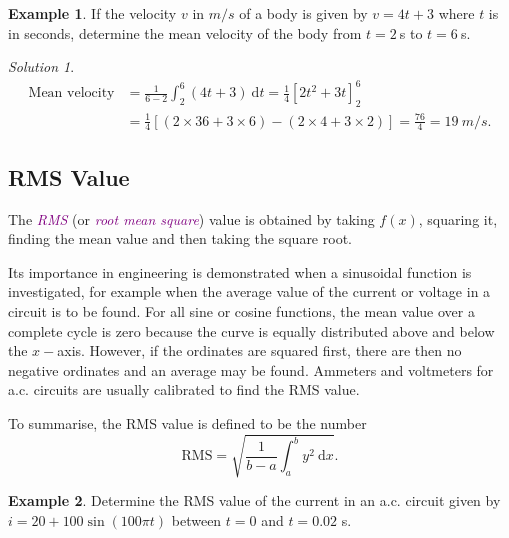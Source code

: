 \documentclass[
  english,
  11pt,
  oneside]{book}
\newcommand{\slide}{}
\theoremstyle{definition}
\theoremstyle{definition}
\newtheorem{example}{Example}[chapter]
\theoremstyle{definition}
\theoremstyle{definition}
\theoremstyle{remark}
\newtheorem*{solution}{Solution}
\begin{document}
\slide

\begin{example}
If the velocity \(v\) in \(m/s\) of a body is given by \(v=4t+3\) where \(t\) is in seconds, determine the mean velocity of the body from \(t=2\ \)s to \(t=6\ \)s.
\end{example}

\begin{solution}
\begin{align*}
\text{Mean velocity}& = \frac{1}{6-2}\int_2^6(4t+3)\ \mathrm{d}t = \frac 14\left[2t^2+3t\right]_2^6\\
&= \frac 14\left[(2\times36+3\times6) -(2\times4+3\times2)\right] = \frac{76}{4}=19\ m/s.
\end{align*}
\end{solution}

\slide

\subsection{RMS Value}\label{rms-value}

The \textcolor{purple}{\em RMS} (or \textcolor{purple}{\em root mean square}) value is obtained by taking \(f(x)\), squaring it, finding the mean value and then taking the square root.

Its importance in engineering is demonstrated when a sinusoidal function is investigated, for example when the average value of the current or voltage in a circuit is to be found. For all sine or cosine functions, the mean value over a complete cycle is zero because the curve is equally distributed above and below the \(x-\)axis. However, if the ordinates are squared first, there are then no negative ordinates and an average may be found. Ammeters and voltmeters for a.c. circuits are usually calibrated to find the RMS value.

To summarise, the RMS value is defined to be the number
\[
\text{RMS} = \sqrt{\frac{1}{b-a}\int_a^b y^2\ \mathrm{d}x}.
\]
\slide

\begin{example}
Determine the RMS value of the current in an a.c. circuit given by \(i=20+100\sin(100\pi t)\) between \(t=0\) and \(t=0.02\) s.
\end{example}
\end{document}
